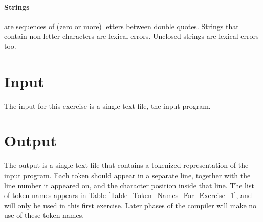 \documentclass{article}
\begin{document}
\paragraph{Strings} are sequences of (zero or more) letters between double quotes.
Strings that contain non letter characters are lexical errors.
Unclosed strings are lexical errors too.
\section{Input}
The input for this exercise is a single text file, the input \plname program.
\section{Output}
The output is a single text file that contains a tokenized representation of the input program.
Each token should appear in a separate line, together with the line number
it appeared on, and the character position inside that line.
The list of token names appears in Table \ref{Table_Token_Names_For_Exercise_1},
and will only be used in this first exercise.
Later phases of the compiler will make no use of these token names.
\end{document}
